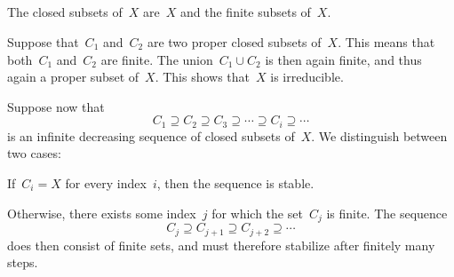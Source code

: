 \subsection{}

The closed subsets of~$X$ are~$X$ and the finite subsets of~$X$.

Suppose that~$C_1$ and~$C_2$ are two proper closed subsets of~$X$.
This means that both~$C_1$ and~$C_2$ are finite.
The union~$C_1 ∪ C_2$ is then again finite, and thus again a proper subset of~$X$.
This shows that~$X$ is irreducible.

Suppose now that
\[
	C_1 ⊇ C_2 ⊇ C_3 ⊇ \dotsb ⊇ C_i ⊇ \dotsb
\]
is an infinite decreasing sequence of closed subsets of~$X$.
We distinguish between two cases:
\begin{itemize*}

	\item
		If~$C_i = X$ for every index~$i$, then the sequence is stable.

	\item
		Otherwise, there exists some index~$j$ for which the set~$C_j$ is finite.
		The sequence
		\[
			C_j ⊇ C_{j + 1} ⊇ C_{j + 2} ⊇ \dotsb
		\]
		does then consist of finite sets, and must therefore stabilize after finitely many steps.

\end{itemize*}
